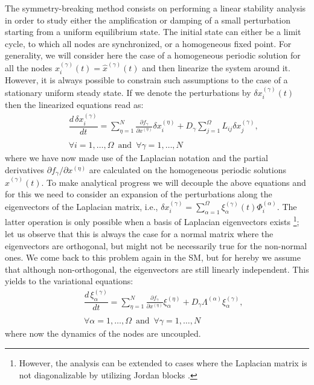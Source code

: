 \documentclass[prx,twocolumn,amsmath,noshowkeys,noshowpacs,amssymb]{revtex4-2}
\newcommand{\teoadd}[1]{\textcolor{blue}{#1}}
\begin{document}
The symmetry-breaking method consists on performing a linear stability analysis in order to study either the amplification or damping of a small perturbation starting from a uniform equilibrium state. The initial state can either be a limit cycle, to which all nodes are synchronized, or a homogeneous fixed point. For generality, we will consider here the case of a homogeneous periodic solution for all the nodes $x_i^{(\gamma)}(t)=\hat{x}^{(\gamma)}(t)$ and then linearize the system around it. However, it is always possible to constrain such assumptions to the case of a stationary uniform steady state.
If we denote the perturbations by $\delta x_i^{(\gamma)}(t)$ then the linearized equations read as:
\begin{eqnarray}
&&\dfrac{d\,\delta x_i^{(\gamma)}}{dt}=\sum_{\eta=1}^N \frac{\partial f_{\gamma}}{\partial x^{(\eta)}}\delta x_i^{(\eta)} + D_{\gamma}\sum_{j=1}^{\Omega}L_{ij} \delta x_j^{(\gamma)},\\\nonumber\\ &&\forall i=1,\dots,\Omega\,\,\, \mathrm{and}\,\,\, \forall \gamma=1,\dots,N\nonumber
\label{eq:linearized}
\end{eqnarray}
where we have now made use of the Laplacian notation and the partial derivatives $\partial f_{\gamma}/\partial x^{(\eta)}$ are calculated on the homogeneous periodic solutions $\hat{x}^{(\gamma)}(t)$. %
{To make analytical progress we will decouple the above equations and for this we need to consider an expansion of the perturbations along the eigenvectors of the Laplacian matrix, i.e., $\delta x_i^{(\gamma)}=\sum_{\alpha=1}^{\Omega} \xi_{\alpha}^{(\gamma)}(t)\Phi_i^{(\alpha)}$. The latter operation is only possible when a basis of Laplacian eigenvectors exists \footnote{However, the analysis can be extended to cases where the Laplacian matrix is not diagonalizable by utilizing Jordan blocks \cite{nondiagonal}.}; let us observe that this is always the case for a normal matrix where the eigenvectors are orthogonal, but might not be necessarily true for the non-normal ones. We come back to this problem again in the SM, but for hereby we assume that although non-orthogonal, the eigenvectors are still linearly independent. This yields to the variational equations:
\begin{eqnarray}
&&\dfrac{d\,\xi_\alpha^{(\gamma)}}{dt}=\sum_{\eta=1}^N \frac{\partial f_{\gamma}}{\partial x^{(\eta)}} \xi_\alpha^{(\eta)} + D_{\gamma} \Lambda^{(\alpha)} \xi_\alpha^{(\gamma)},\\\nonumber\\ &&\forall \alpha=1,\dots,\Omega\,\,\, \mathrm{and}\,\,\, \forall \gamma=1,\dots,N\nonumber
\label{eq:MSF}
\end{eqnarray}
where now the dynamics of the nodes are uncoupled.}
\end{document}
